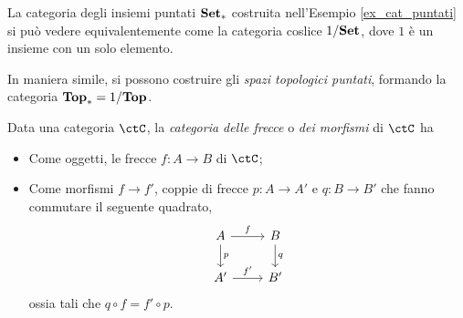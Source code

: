 
\begin{example}\label{def_spazi_pun_coslice}
	La categoria degli insiemi puntati \(\mathbf{Set}_*\) costruita nell'Esempio \ref{ex_cat_puntati} si può vedere equivalentemente come la categoria coslice \(1/\mathbf{Set}\), dove \(1\) è un insieme con un solo elemento.
	
	In maniera simile, si possono costruire gli \emph{spazi topologici puntati}, formando la categoria \(\mathbf{Top}_*=1/\mathbf{Top}\). 
\end{example}


\begin{definition}\label{def_cat_frecce}
	Data una categoria \(\ctC\), la \emph{categoria delle frecce} o \emph{dei morfismi} di \(\ctC\) ha 
	\begin{itemize}
		\item Come oggetti, le frecce \(f:A\to B\) di \(\ctC\);
		\item Come morfismi \(f\to f'\), coppie di frecce \(p:A\to A'\) e \(q:B\to B'\) che fanno commutare il seguente quadrato,
		\[
		\begin{tikzcd}
			A \ar{r}{f} \ar{d}{p} & B \ar{d}{q} \\
			A' \ar{r}{f'} & B'
		\end{tikzcd}
		\]
		ossia tali che \(q\circ f=f'\circ p\).
	\end{itemize}
\end{definition}

